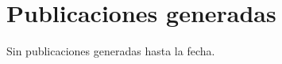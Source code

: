 \section{Publicaciones generadas}
\label{sec:publicaciones}


Sin publicaciones generadas hasta la fecha.

